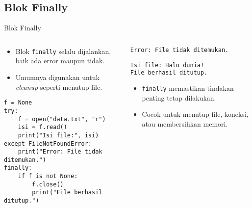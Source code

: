 \documentclass[aspectratio=169, table]{beamer}
\begin{document}
\subsection*{Blok Finally}
\begin{frame}[fragile]{Blok Finally}
\vspace*{10pt}
\begin{columns}[T]
\begin{column}{0.6\textwidth}
\begin{itemize}
  \item Blok \texttt{finally} selalu dijalankan,
  baik ada error maupun tidak.
  \item Umumnya digunakan untuk \textit{cleanup} seperti menutup file.
\end{itemize}

\begin{lstlisting}[style=PythonStyle]
f = None
try:
    f = open("data.txt", "r")
    isi = f.read()
    print("Isi file:", isi)
except FileNotFoundError:
    print("Error: File tidak ditemukan.")
finally:
    if f is not None:
        f.close()
        print("File berhasil ditutup.")
\end{lstlisting}
\end{column}

\begin{column}{0.35\textwidth}
\begin{lstlisting}[language=bash]
Error: File tidak ditemukan.

Isi file: Halo dunia!
File berhasil ditutup.
\end{lstlisting}

\begin{itemize}
  \item \texttt{finally} memastikan tindakan penting tetap dilakukan.
  \item Cocok untuk menutup file, koneksi, atau membersihkan memori.
\end{itemize}
\end{column}
\end{columns}
\end{frame}
\end{document}
